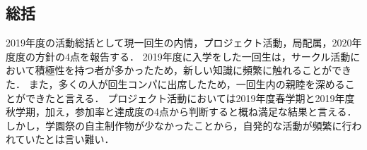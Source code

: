 \subsection*{\firstGrade{}総括}




2019年度の活動総括として現一回生の内情，プロジェクト活動，局配属，2020年度度の方針の4点を報告する．
2019年度に入学をした一回生は，サークル活動において積極性を持つ者が多かったため，新しい知識に頻繁に触れることができた．
また，多くの人が回生コンパに出席したため，一回生内の親睦を深めることができたと言える．
プロジェクト活動においては2019年度春学期と2019年度秋学期，加え，参加率と達成度の4点から判断すると概ね満足な結果と言える．
しかし，学園祭の自主制作物が少なかったことから，自発的な活動が頻繁に行われていたとは言い難い．

